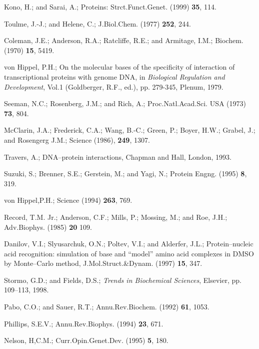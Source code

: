 \begin{thebibliography}{999}
Kono, H.; and Sarai, A.;
Proteins: Strct.Funct.Genet. (1999) {\bf 35}, 114.

Toulme, J.-J.; and Helene, C.;
J.Biol.Chem. (1977) {\bf 252}, 244.

Coleman, J.E.; Anderson, R.A.; Ratcliffe, R.E.; and
Armitage, I.M.;
Biochem. (1970) {\bf 15}, 5419.

von Hippel, P.H.;
On the molecular bases of the specificity of interaction
of transcriptional proteins with genome DNA,
in {\em Biological Regulation and Development}, Vol.1
(Goldberger, R.F., ed.), pp. 279-345, Plenum, 1979.


Seeman, N.C.; Rosenberg, J.M.; and Rich, A.;
Proc.Natl.Acad.Sci. USA (1973) {\bf 73}, 804.


McClarin, J.A.; Frederick, C.A.; Wang, B.-C.; Green, P.;
Boyer, H.W.; Grabel, J.; and Rosengerg J.M.;
Science (1986), {\bf 249}, 1307.


Travers, A.; DNA--protein interactions, Chapman and Hall, London,
1993.

Suzuki, S.; Brenner, S.E.; Gerstein, M.; and Yagi, N.;
Protein Engng. (1995) {\bf 8}, 319.

von Hippel,P.H.; Science (1994) {\bf 263}, 769.   

Record, T.M. Jr.; Anderson, C.F.; Mills, P.; Mossing, M.;
and Roe, J.H.;
Adv.Biophys. (1985) {\bf 20} 109. 

Danilov, V.I.; Slyusarchuk, O.N.; Poltev, V.I.;
and Alderfer, J.L.;
Protein--nucleic acid recognition: simulation of base and ``model''
amino acid complexes in DMSO by Monte--Carlo method,
J.Mol.Struct.\&Dynam. (1997) {\bf 15}, 347.


Stormo, G.D.; and Fields, D.S.;
{\em Trends in Biochemical Sciences},
Elsevier, 
pp. 109--113, 1998.

Pabo, C.O.; and Sauer, R.T.;
Annu.Rev.Biochem. (1992) {\bf 61}, 1053.

Phillips, S.E.V.;
Annu.Rev.Biophys. (1994) {\bf 23}, 671.

Nelson, H,C.M.;
Curr.Opin.Genet.Dev. (1995) {\bf 5}, 180.


\end{thebibliography}
